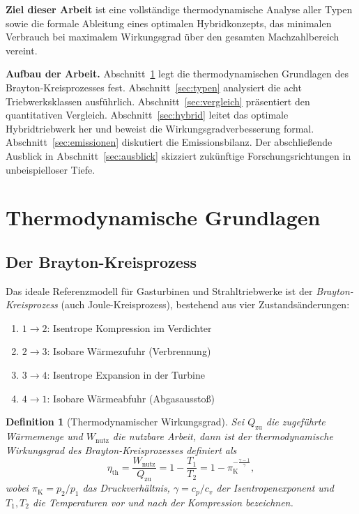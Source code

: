 ﻿\documentclass[12pt,a4paper]{article}
\newtheorem{definition}[theorem]{Definition}
\theoremstyle{remark}
\newcommand{\piK}{\pi_{\mathrm{K}}}
\newcommand{\etath}{\eta_{\mathrm{th}}}
\begin{document}
\medskip
\textbf{Ziel dieser Arbeit} ist eine vollst\"andige thermodynamische Analyse aller Typen
sowie die formale Ableitung eines optimalen Hybridkonzepts, das minimalen Verbrauch
bei maximalem Wirkungsgrad \"uber den gesamten Machzahlbereich vereint.

\medskip
\textbf{Aufbau der Arbeit.}
Abschnitt~\ref{sec:grundlagen} legt die thermodynamischen Grundlagen des
Brayton-Kreisprozesses fest.
Abschnitt~\ref{sec:typen} analysiert die acht Triebwerksklassen ausf\"uhrlich.
Abschnitt~\ref{sec:vergleich} pr\"asentiert den quantitativen Vergleich.
Abschnitt~\ref{sec:hybrid} leitet das optimale Hybridtriebwerk her und beweist
die Wirkungsgradverbesserung formal.
Abschnitt~\ref{sec:emissionen} diskutiert die Emissionsbilanz.
Der abschlie{\ss}ende Ausblick in Abschnitt~\ref{sec:ausblick} skizziert
zuk\"unftige Forschungsrichtungen in unbeispielloser Tiefe.

\section{Thermodynamische Grundlagen}
\label{sec:grundlagen}

\subsection{Der Brayton-Kreisprozess}

Das ideale Referenzmodell f\"ur Gasturbinen und Strahltriebwerke ist der
\emph{Brayton-Kreisprozess} (auch Joule-Kreisprozess), bestehend aus vier Zustandsänderungen:

\begin{enumerate}[label=(\arabic*)]
  \item $1 \to 2$: Isentrope Kompression im Verdichter
  \item $2 \to 3$: Isobare W\"armezufuhr (Verbrennung)
  \item $3 \to 4$: Isentrope Expansion in der Turbine
  \item $4 \to 1$: Isobare W\"armeabfuhr (Abgasausstoß)
\end{enumerate}

\begin{definition}[Thermodynamischer Wirkungsgrad]
Sei $Q_{\mathrm{zu}}$ die zugef\"uhrte W\"armemenge und $W_{\mathrm{nutz}}$ die nutzbare Arbeit,
dann ist der thermodynamische Wirkungsgrad des Brayton-Kreisprozesses definiert als
\begin{equation}
  \etath = \frac{W_{\mathrm{nutz}}}{Q_{\mathrm{zu}}}
         = 1 - \frac{T_1}{T_2}
         = 1 - \piK^{-\frac{\gamma-1}{\gamma}},
  \label{eq:eta_brayton}
\end{equation}
wobei $\piK = p_2/p_1$ das Druckverh\"altnis, $\gamma = c_p/c_v$ der Isentropenexponent
und $T_1, T_2$ die Temperaturen vor und nach der Kompression bezeichnen.
\end{definition}
\end{document}
